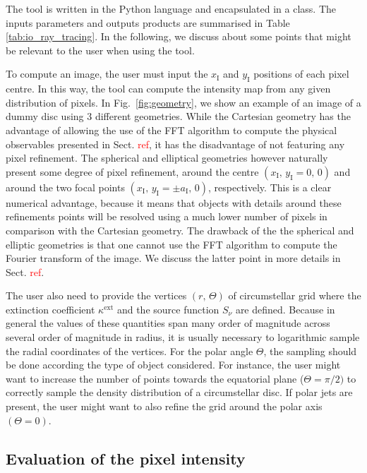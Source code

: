 \documentclass{report}
\newcommand{\kext}{\kappa^\mathrm{ext}}
\newcommand{\Snu}{S_\nu}
\newcommand{\xI}{x_\mathrm{I}}
\newcommand{\yI}{y_\mathrm{I}}
\newcommand{\aI}{a_\mathrm{I}}
\begin{document}
    The tool is written in the Python language and encapsulated in a class. The inputs parameters and outputs products are summarised in Table \ref{tab:io_ray_tracing}. In the following, we discuss about some points that might be relevant to the user when using the tool.
    
    To compute an image, the user must input the $\xI$ and $\yI$ positions of each pixel centre. In this way, the tool can compute the intensity map from any given distribution of pixels. In Fig.~\ref{fig:geometry}, we show an example of an image of a dummy disc using 3 different geometries. While the Cartesian geometry has the advantage of allowing the use of the FFT algorithm to compute the physical observables presented in Sect. \textcolor{red}{ref}, it has the disadvantage of not featuring any pixel refinement. The spherical and elliptical geometries however naturally present some degree of pixel refinement, around the centre $(\xI, \, \yI = 0, \, 0)$ and around the two focal points $(\xI, \, \yI = \pm \aI, \, 0)$, respectively. This is a clear numerical advantage, because it means that objects with details around these refinements points will be resolved using a much lower number of pixels in comparison with the Cartesian geometry. The drawback of the the spherical and elliptic geometries is that one cannot use the FFT algorithm to compute the Fourier transform of the image. We discuss the latter point in more details in Sect. \textcolor{red}{ref}.
    
    The user also need to provide the vertices $(r, \, \Theta)$ of circumstellar grid where the extinction coefficient $\kext$ and the source function $\Snu$ are defined. Because in general the values of these quantities span many order of magnitude across several order of magnitude in radius, it is usually necessary to logarithmic sample the radial coordinates of the vertices. For the polar angle $\Theta$, the sampling should be done according the type of object considered. For instance, the user might want to increase the number of points towards the equatorial plane ($\Theta = \pi / 2)$ to correctly sample the density distribution of a circumstellar disc. If polar jets are present, the user might want to also refine the grid around the polar axis $(\Theta = 0)$.
    
  \subsection{Evaluation of the pixel intensity} \label{sect:desc_ray}
\end{document}
